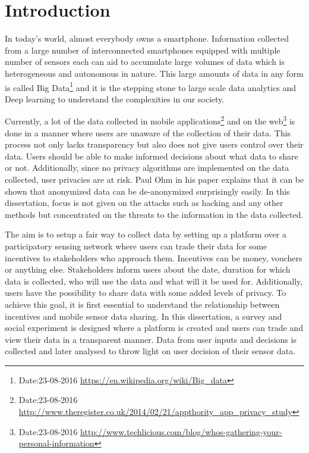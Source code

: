 \chapter{Introduction}

In today's world, almost everybody owns a smartphone. Information collected from a large number of interconnected smartphones equipped with
multiple number of sensors each can aid to accumulate large volumes of data which is heterogeneous and autonomous in nature. This large amounts of data in any form is called Big Data\footnote{Date:23-08-2016 \url{https://en.wikipedia.org/wiki/Big\_data}} and it
is the stepping stone to large scale data analytics and Deep learning to understand the complexities in our society. 

Currently, a lot of the data collected in mobile applications\footnote{Date:23-08-2016 \url{http://www.theregister.co.uk/2014/02/21/appthority\_app_privacy\_study}} and on the web\footnote{Date:23-08-2016 \url{http://www.techlicious.com/blog/whos-gathering-your-personal-information}}
is done in a manner where users are unaware of the collection of their data. This process not only lacks transparency but also does not give users
control over their data. Users should be able to make informed decisions about what data to share or not. Additionally, since no privacy algorithms 
are implemented on the data collected, user privacies are at risk. Paul Ohm in his paper \cite{ohm2010broken} explains that it can be shown that anonymized data can be de-anonymized surprisingly easily. In this dissertation, focus is not given on the attacks such as hacking and any other methods but concentrated on the threats to the information in the data collected.

The aim is to setup a fair way to collect data by setting up a platform over a participatory sensing network where users can trade their data for some incentives to stakeholders who approach them.
Incentives can be money, vouchers or anything else. Stakeholders inform users about the date, duration for which data is collected, who will use the data and what will it be used for. Additionally, users have the possibility to share data with some added levels of privacy. 
To achieve this goal, it is first essential to understand the relationship between incentives and mobile sensor data sharing. In this dissertation, a survey and social experiment is designed where a platform is created and users can trade and view their data in a transparent manner. Data from user inputs and decisions is collected and later analysed to throw light on user decision of their sensor data.






